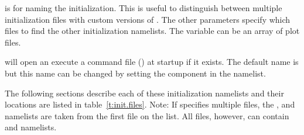  is for naming the initialization. This is useful to
distinguish between multiple initialization files with custom versions
of \tao. The other parameters specify which files to find the other
initialization namelists. The  variable can be an array
of plot files. 

\tao will open an execute a command file () at startup if it exists.  The
default name is  but this name can be changed by setting the 
component in the  namelist.

The following sections describe each of these initialization namelists
and their locations are listed in table~\ref{t:init.files}. Note: If
 specifies multiple files, the ,
 and 
namelists are taken from the first file on the list. All files,
however, can contain  and
 namelists.

